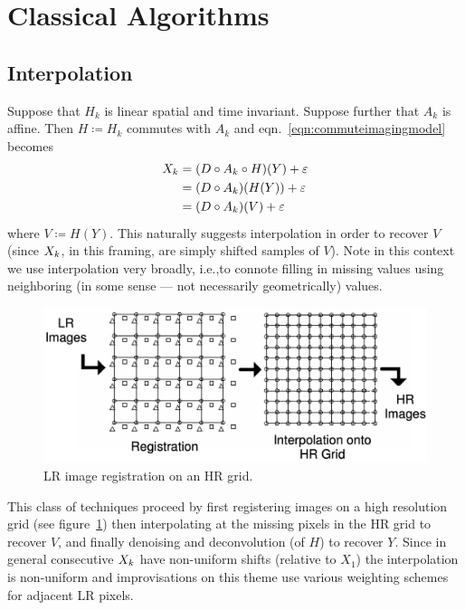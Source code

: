 \section{Classical Algorithms}\label{sec:classical-algorithms}
\localtableofcontents
\subsection{Interpolation}\label{subsec:interpolation}

Suppose that \(H_k\) is linear spatial and time invariant.
%
Suppose further that \(A_k\) is affine.
%
Then \(H \coloneqq H_k\) commutes with \(A_k\)\cite{meladcommute} and eqn.~\eqref{eqn:commuteimagingmodel} becomes
\begin{equation}
    \label{eqn:commuteimagingmodel}
    \begin{split}
        X_k &= (D \circ A_k \circ H) (Y) + \varepsilon \\
        &= (D \circ A_k) (H(Y)) + \varepsilon \\
        &= (D \circ A_k) (V) + \varepsilon
    \end{split}
\end{equation}
%
where \(V \coloneqq H(Y)\).
%
This naturally suggests interpolation in order to recover \(V\) (since \(X_k\), in this framing, are simply shifted samples of \(V\)).
%
Note in this context we use interpolation very broadly, i.e.,to connote filling in missing values using neighboring (in some sense --- not necessarily geometrically) values.
%
\begin{figure}
    \centering
    \includegraphics[width=\linewidth,keepaspectratio]{figures/classical/hrgrid.png}
    \caption{LR image registration on an HR grid\cite{Lin}.}
    \label{fig:hrgrid}
\end{figure}
This class of techniques proceed by first registering images on a high resolution grid (see figure~\ref{fig:hrgrid}) then interpolating at the missing pixels in the HR grid to recover \(V\), and finally denoising and deconvolution (of \(H\)) to recover \(Y\).
%
Since in general consecutive \(X_k\) have non-uniform shifts (relative to \(X_1\)) the interpolation is non-uniform and improvisations on this theme use various weighting schemes for adjacent LR pixels.

